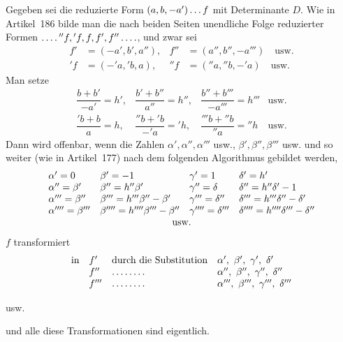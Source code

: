 Gegeben sei die reduzierte Form $(a,b,-a')\mathinner{\ldotp\ldotp\ldotp} f$ mit Determinante $D$. Wie in Artikel~186 bilde man die nach beiden Seiten unendliche Folge reduzierter Formen $\mathinner{\ldotp\ldotp\ldotp\ldotp} {}''f,{}'f,f,f',f''\mathinner{\ldotp\ldotp\ldotp\ldotp}$, und zwar sei
\[
\begin{aligned}
f'&=(-a',b',a''),& f''&=(a'',b'',-a''')\quad\text{usw.}\\
{}'f&=(-{}'a,{}'b,a),& {}''f&=({}''a,{}''b,-{}'a)\quad\text{usw.}
\end{aligned}
\]
Man setze
\[
\begin{array}{llll}
\dfrac{b+b'}{-a'}=h',&\dfrac{b'+b''}{a''}=h'',&\dfrac{b''+b'''}{-a'''}=h'''&\text{usw.}\\[6pt]
\dfrac{{}'b+b}{a}=h,&\dfrac{{}''b+{}'b}{-{}'a}={}'h,&\dfrac{{}'''b+{}''b}{{}''a}={}''h&\text{usw.}
\end{array}
\]
Dann wird offenbar, wenn die Zahlen $\alpha',\alpha'',\alpha'''$ usw., $\beta',\beta'',\beta'''$ usw. und so weiter (wie in Artikel~177) nach dem folgenden Algorithmus gebildet werden,
{\small
\setlength{\arraycolsep}{3pt}
\[
\begin{array}{llll}
\alpha'=0&\beta'=-1&\gamma'=1&\delta'=h'\\
\alpha''=\beta'&\beta''=h''\beta'&\gamma''=\delta&\delta''=h''\delta'-1\\
\alpha'''=\beta''&\beta'''=h'''\beta''-\beta'&\gamma'''=\delta''&\delta'''=h'''\delta''-\delta'\\
\alpha''''=\beta'''&\beta''''=h''''\beta'''-\beta''&\gamma''''=\delta'''&\delta''''=h''''\delta'''-\delta''
\\
\multicolumn{4}{c}{\text{usw.}}
\end{array}
\]
}
$f$ transformiert
\[
\begin{array}{@{}rlll@{}}
\text{in}&f'&\text{durch die Substitution}&\alpha',\ \beta',\ \gamma',\ \delta'\\
&f''&\mathinner{\ldotp\ldotp\ldotp\ldotp\ldotp\ldotp\ldotp\ldotp}&\alpha'',\ \beta'',\ \gamma'',\ \delta''\\
&f'''&\mathinner{\ldotp\ldotp\ldotp\ldotp\ldotp\ldotp\ldotp\ldotp}&\alpha''',\ \beta''',\ \gamma''',\ \delta'''
\end{array}
\]
\centerline{usw.}
und alle diese Transformationen sind eigentlich.

